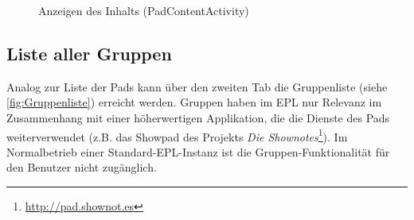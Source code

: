 \begin{figure}[h!]
    \centering
    \setlength\fboxsep{0pt}
	  \caption{Anzeigen des Inhalts (PadContentActivity)}
	  \label{fig:text}
\end{figure}

\subsection{Liste aller Gruppen}
Analog zur Liste der Pads kann über den zweiten Tab die Gruppenliste (siehe \autoref{fig:Gruppenliste}) erreicht werden.
Gruppen haben im EPL nur Relevanz im Zusammenhang mit einer höherwertigen Applikation, die die Dienste des Pads weiterverwendet (z.B. das Showpad des Projekts \textit{Die Shownotes}\footnote{\url{http://pad.shownot.es}}).
Im Normalbetrieb einer Standard-EPL-Instanz ist die Gruppen-Funktionalität für den Benutzer nicht zugänglich.

